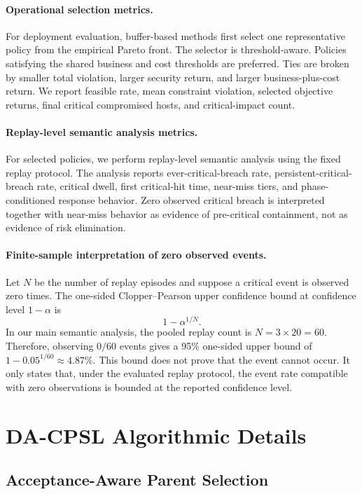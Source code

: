 \documentclass[sigconf,review,anonymous]{acmart}
\begin{document}
\paragraph{Operational selection metrics.}
For deployment evaluation, buffer-based methods first select one
representative policy from the empirical Pareto front. The selector is
threshold-aware. Policies satisfying the shared business and cost
thresholds are preferred. Ties are broken by smaller total violation,
larger security return, and larger business-plus-cost return. We report
feasible rate, mean constraint violation, selected objective returns,
final critical compromised hosts, and critical-impact count.

\paragraph{Replay-level semantic analysis metrics.}
For selected policies, we perform replay-level semantic analysis using
the fixed replay protocol. The analysis reports ever-critical-breach
rate, persistent-critical-breach rate, critical dwell, first critical-hit
time, near-miss tiers, and phase-conditioned response behavior. Zero
observed critical breach is interpreted together with near-miss behavior
as evidence of pre-critical containment, not as evidence of risk
elimination.

\paragraph{Finite-sample interpretation of zero observed events.}
Let \(N\) be the number of replay episodes and suppose a critical event
is observed zero times. The one-sided Clopper--Pearson upper confidence
bound at confidence level \(1-\alpha\) is
\[
1-\alpha^{1/N}.
\]
In our main semantic analysis, the pooled replay count is
\(N=3\times 20=60\). Therefore, observing \(0/60\) events gives a
95\% one-sided upper bound of \(1-0.05^{1/60}\approx4.87\%\). This bound
does not prove that the event cannot occur. It only states that, under
the evaluated replay protocol, the event rate compatible with zero
observations is bounded at the reported confidence level.

\section{DA-CPSL Algorithmic Details}
\label{app:dacpsl-details}

\subsection{Acceptance-Aware Parent Selection}
\label{app:parent-selection}
\end{document}
